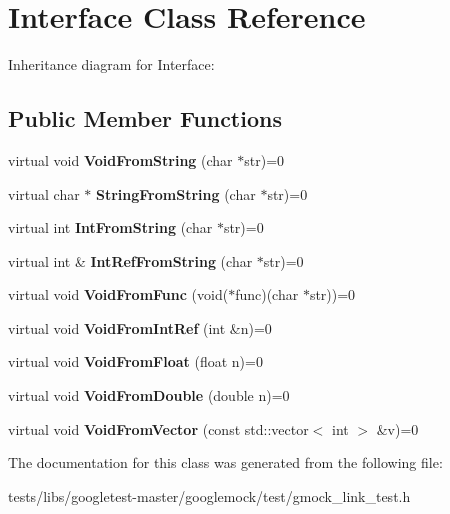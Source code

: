 \hypertarget{classInterface}{}\section{Interface Class Reference}
\label{classInterface}


Inheritance diagram for Interface\+:
\subsection*{Public Member Functions}
\begin{DoxyCompactItemize}
\item 
\mbox{\label{classInterface_a65d6ae604e7e9a513aec72c9c94e0b97}} 
virtual void {\bfseries Void\+From\+String} (char $\ast$str)=0
\item 
\mbox{\label{classInterface_a756b1d22c12aa3f14a5083f90043fbf0}} 
virtual char $\ast$ {\bfseries String\+From\+String} (char $\ast$str)=0
\item 
\mbox{\label{classInterface_ab34c8a5fd2236a6b009f86a4e5851b61}} 
virtual int {\bfseries Int\+From\+String} (char $\ast$str)=0
\item 
\mbox{\label{classInterface_ab93276de67e60c44fd775d4c139aa8e1}} 
virtual int \& {\bfseries Int\+Ref\+From\+String} (char $\ast$str)=0
\item 
\mbox{\label{classInterface_a7dab3c82b857a9a5f52b3ce6f7df547f}} 
virtual void {\bfseries Void\+From\+Func} (void($\ast$func)(char $\ast$str))=0
\item 
\mbox{\label{classInterface_aa43fb56650a57b6b3e7743e54e50cb86}} 
virtual void {\bfseries Void\+From\+Int\+Ref} (int \&n)=0
\item 
\mbox{\label{classInterface_ae2b3e9411c893a45642d3af632752c66}} 
virtual void {\bfseries Void\+From\+Float} (float n)=0
\item 
\mbox{\label{classInterface_aa56524017aabdbe46510648c711ab8a8}} 
virtual void {\bfseries Void\+From\+Double} (double n)=0
\item 
\mbox{\label{classInterface_ae84fe7e53f881db2f823ad35d004927a}} 
virtual void {\bfseries Void\+From\+Vector} (const std\+::vector$<$ int $>$ \&v)=0
\end{DoxyCompactItemize}


The documentation for this class was generated from the following file\+:\begin{DoxyCompactItemize}
\item 
tests/libs/googletest-\/master/googlemock/test/gmock\+\_\+link\+\_\+test.\+h\end{DoxyCompactItemize}
